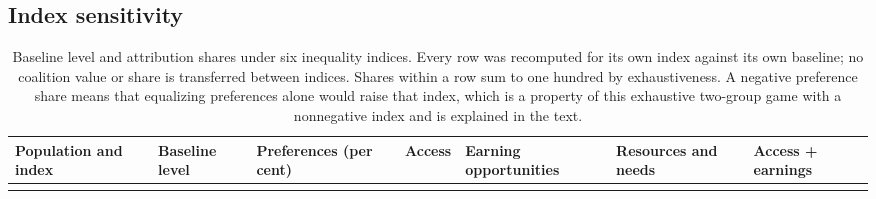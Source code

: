 \subsection{Index sensitivity}\label{index-sensitivity}

\small\setlength{\tabcolsep}{3pt}\begin{longtable}[]{@{}
  >{\raggedright\arraybackslash}p{}
  >{\raggedright\arraybackslash}p{}
  >{\raggedright\arraybackslash}p{}
  >{\raggedright\arraybackslash}p{}
  >{\raggedright\arraybackslash}p{}
  >{\raggedright\arraybackslash}p{}
  >{\raggedright\arraybackslash}p{}@{}}
\caption{Baseline level and attribution shares under six inequality indices. Every row was recomputed for its own index against its own baseline; no coalition value or share is transferred between indices. Shares within a row sum to one hundred by exhaustiveness. A negative preference share means that equalizing preferences alone would raise that index, which is a property of this exhaustive two-group game with a nonnegative index and is explained in the text.}\tabularnewline
\toprule\noalign{}
\begin{minipage}[b]{\linewidth}\raggedright
Population and index
\end{minipage} & \begin{minipage}[b]{\linewidth}\raggedright
Baseline level
\end{minipage} & \begin{minipage}[b]{\linewidth}\raggedright
Preferences (per cent)
\end{minipage} & \begin{minipage}[b]{\linewidth}\raggedright
Access
\end{minipage} & \begin{minipage}[b]{\linewidth}\raggedright
Earning opportunities
\end{minipage} & \begin{minipage}[b]{\linewidth}\raggedright
Resources and needs
\end{minipage} & \begin{minipage}[b]{\linewidth}\raggedright
Access + earnings
\end{minipage} \\
\midrule\noalign{}

\end{longtable}
